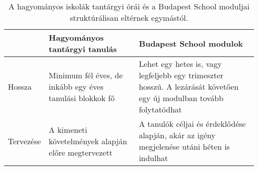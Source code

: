 \begin{table}[h]
\centering
\begin{tabular}{@{}p{1.5cm}|p{4cm}|p{4cm}@{}}

& \textbf{Hagyományos tantárgyi tanulás}  & \textbf{ Budapest School modulok}
\\ \hline
   Hossza &
   Minimum fél éves, de inkább egy éves tanulási blokkok fő &
   Lehet egy hetes is, vagy legfeljebb egy trimeszter hosszú. A lezárását követően egy új modulban tovább folytatódhat \\ \hline
Tervezése & A kimeneti követelmények alapján előre megtervezett &
 A tanulók céljai és érdeklődése alapján, akár az igény megjelenése utáni héten is indulhat\\ \hline

\end{tabular}
\caption{A hagyományos iskolák tantárgyi órái és a Budapest School moduljai struktúrálisan eltérnek egymástól.}

\label{tanorak-vs-modulok}

\end{table}
